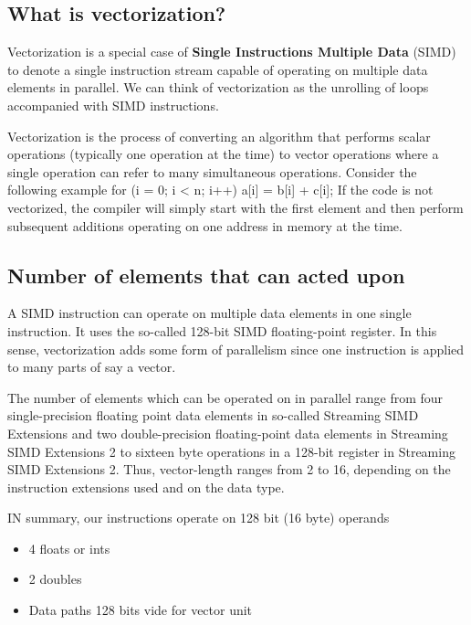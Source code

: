 \documentclass[%
oneside,                 %
final,                   %
10pt]{article}
\begin{document}
\noindent




\subsection{What is vectorization?}
Vectorization is a special
case of \textbf{Single Instructions Multiple Data} (SIMD) to denote a single
instruction stream capable of operating on multiple data elements in
parallel. 
We can think of vectorization as the unrolling of loops accompanied with SIMD instructions.

Vectorization is the process of converting an algorithm that performs scalar operations
(typically one operation at the time) to vector operations where a single operation can refer to many simultaneous operations.
Consider the following example
\bcppcod
for (i = 0; i < n; i++){
    a[i] = b[i] + c[i];
}
\ecppcod
If the code is not vectorized, the compiler will simply start with the first element and 
then perform subsequent additions operating on one address in memory at the time. 

\subsection{Number of elements that can acted upon}
A SIMD instruction can operate  on multiple data elements in one single instruction.
It uses the so-called 128-bit SIMD floating-point register. 
In this sense, vectorization adds some form of parallelism since one instruction is applied  
to many parts of say a vector.

The number of elements which can be operated on in parallel
range from four single-precision floating point data elements in so-called 
Streaming SIMD Extensions and two double-precision floating-point data
elements in Streaming SIMD Extensions 2 to sixteen byte operations in
a 128-bit register in Streaming SIMD Extensions 2. Thus, vector-length
ranges from 2 to 16, depending on the instruction extensions used and
on the data type. 

IN summary, our instructions  operate on 128 bit (16 byte) operands
\begin{itemize}
\item 4 floats or ints

\item 2 doubles

\item Data paths 128 bits vide for vector unit
\end{itemize}
\end{document}
